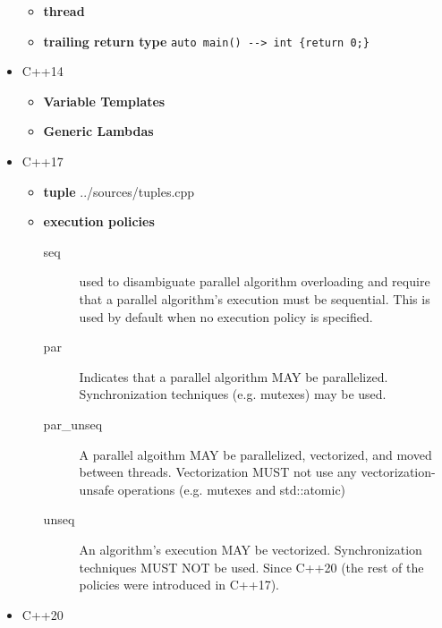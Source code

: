 \documentclass{article}
\begin{document}
\begin{itemize}
\begin{itemize}
		      \item \textbf{thread}
		      \item \textbf{trailing return type}
		            \verb!auto main() --> int {return 0;}!
	      \end{itemize}
	\item C++14
	      \begin{itemize}
		      \item \textbf{Variable Templates}
		      \item \textbf{Generic Lambdas}
	      \end{itemize}
	\item C++17
	      \begin{itemize}
		      \item \textbf{tuple}
		             {../sources/tuples.cpp}
		      \item \textbf{execution policies}
		            \begin{description}
			            \item[seq]
			                  used to disambiguate parallel algorithm overloading and require that a parallel algorithm's execution must be sequential. This is used by default when no execution policy is specified.
		            \end{description}
		            \begin{description}
			            \item[par]
			                  Indicates that a parallel algorithm MAY be parallelized. Synchronization techniques (e.g. mutexes) may be used.
		            \end{description}
		            \begin{description}
			            \item[par\_unseq]
			                  A parallel algoithm MAY be parallelized, vectorized, and moved between threads. Vectorization MUST not use any vectorization-unsafe operations (e.g. mutexes and std::atomic)
		            \end{description}
		            \begin{description}
			            \item[unseq]
			                  An algorithm's execution MAY be vectorized. Synchronization techniques MUST NOT be used. Since C++20 (the rest of the policies were introduced in C++17).
		            \end{description}
	      \end{itemize}
	\item C++20

\end{itemize}
\end{document}
